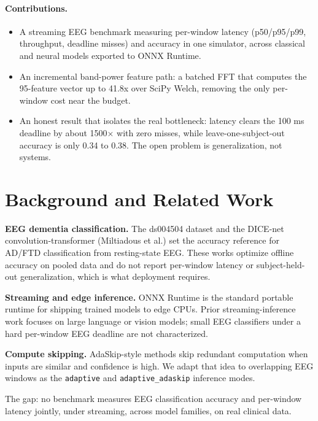 \documentclass[10pt,twocolumn]{article}
\newcommand{\code}[1]{\texttt{#1}}
\begin{document}
\paragraph{Contributions.}
\begin{itemize}
\item A streaming EEG benchmark measuring per-window latency (p50/p95/p99,
throughput, deadline misses) and accuracy in one simulator, across classical and
neural models exported to ONNX Runtime.
\item An incremental band-power feature path: a batched FFT that computes the
95-feature vector up to 41.8x over SciPy Welch, removing the only per-window cost
near the budget.
\item An honest result that isolates the real bottleneck: latency clears the
100 ms deadline by about 1500$\times$ with zero misses, while
leave-one-subject-out accuracy is only 0.34 to 0.38. The open problem is
generalization, not systems.
\end{itemize}

\section{Background and Related Work}
\textbf{EEG dementia classification.} The ds004504 dataset and the DICE-net
convolution-transformer (Miltiadous et al.) set the accuracy reference for AD/FTD
classification from resting-state EEG. These works optimize offline accuracy on
pooled data and do not report per-window latency or subject-held-out
generalization, which is what deployment requires.

\textbf{Streaming and edge inference.} ONNX Runtime is the standard portable
runtime for shipping trained models to edge CPUs. Prior streaming-inference work
focuses on large language or vision models; small EEG classifiers under a
hard per-window EEG deadline are not characterized.

\textbf{Compute skipping.} AdaSkip-style methods skip redundant computation when
inputs are similar and confidence is high. We adapt that idea to overlapping EEG
windows as the \code{adaptive} and \code{adaptive\_adaskip} inference modes.

The gap: no benchmark measures EEG classification accuracy and per-window latency
jointly, under streaming, across model families, on real clinical data.
\end{document}
